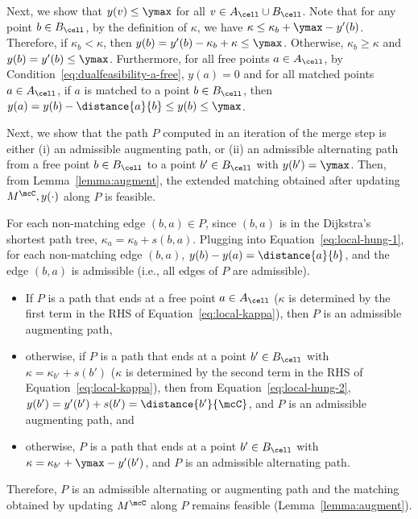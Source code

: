      Next, we show that $y(v)\le \ymax$ for all $v\in A_\cell\cup B_\cell$. Note that for any point $b\in B_\cell$, by the definition of $\kappa$, we have $\kappa\le \kappa_b+\ymax-y'(b)$. Therefore, if $\kappa_b<\kappa$, then $y(b) = y'(b)-\kappa_b+\kappa\le \ymax$. Otherwise, $\kappa_b\ge \kappa$ and $y(b)=y'(b)\le \ymax$. Furthermore, for all free points $a\in A_\cell$, by Condition~\eqref{eq:dualfeasibility-a-free}, $y(a)=0$ and for all matched points $a\in A_\cell$, if $a$ is matched to a point $b\in B_\cell$, then $y(a)=y(b)-\distance{a}{b}\le y(b)\le \ymax$.
    


     Next, we show that the path $P$ computed in an iteration of the merge step is either (i) an admissible augmenting path, or (ii) an admissible alternating path from a free point $b\in B_\cell$ to a point $b'\in B_\cell$ with $y(b')=\ymax$. Then, from Lemma~\ref{lemma:augment}, the extended matching obtained after updating $M^\mcC, y(\cdot)$ along $P$ is feasible.
    
    For each non-matching edge $(b,a)\in P$, since $(b,a)$ is in the Dijkstra's shortest path tree, $\kappa_a = \kappa_b + s(b,a)$. Plugging into Equation~\eqref{eq:local-hung-1}, for each non-matching edge $(b,a)$, $y(b)-y(a)=\distance{a}{b}$, and the edge $(b,a)$ is admissible (i.e., all edges of $P$ are admissible).
    \begin{itemize}
        \item If $P$ is a path that ends at a free point $a\in A_\cell$ ($\kappa$ is determined by the first term in the RHS of Equation~\eqref{eq:local-kappa}), then $P$ is an admissible augmenting path, 
        \item otherwise, if $P$ is a path that ends at a point $b'\in B_\cell$ with $\kappa=\kappa_{b'}+s(b')$ ($\kappa$ is determined by the second term in the RHS of Equation~\eqref{eq:local-kappa}), then from Equation~\eqref{eq:local-hung-2}, $y(b') = y'(b')+s(b') = \distance{b'}{\mcC}$, and $P$ is an admissible augmenting path, and
        \item otherwise, $P$ is a path that ends at a point $b'\in B_\cell$ with $\kappa=\kappa_{b'}+\ymax-y'(b')$, and $P$ is an admissible alternating path.
    \end{itemize}
    Therefore, $P$ is an admissible alternating or augmenting path and the matching obtained by updating $M^\mcC$ along $P$ remains feasible (Lemma~\ref{lemma:augment}). 
    
